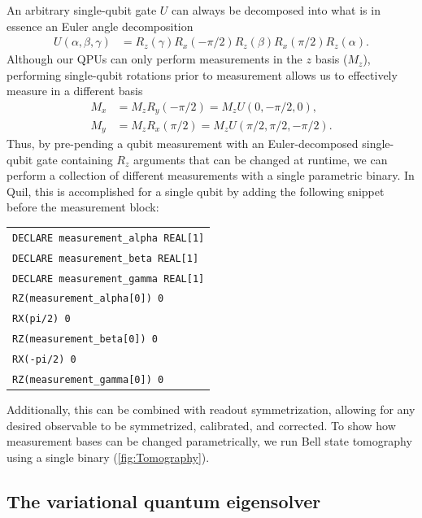 \documentclass[12pt]{iopart}
\begin{document}
An arbitrary single-qubit gate $U$ can always be decomposed into what is in essence an Euler angle decomposition~\cite{MikeAndIke}
\begin{align}
    U(\alpha, \beta, \gamma) &= R_z(\gamma) R_x(-\pi/2) R_z(\beta) R_x(\pi/2) R_z(\alpha).
\end{align}
Although our QPUs can only perform measurements in the $z$ basis ($M_z$), performing single-qubit rotations prior to measurement allows us to effectively measure in a different basis
\begin{align}
    M_x &= M_z R_y(-\pi/2) = M_z U(0, -\pi/2, 0),\\
    M_y &= M_z R_x(\pi/2) = M_z U(\pi/2, \pi/2, -\pi/2).
\end{align}
Thus, by pre-pending a qubit measurement with an Euler-decomposed single-qubit gate containing $R_z$ arguments that can be changed at runtime, we can perform a collection of different measurements with a single parametric binary. In Quil, this is accomplished for a single qubit by adding the following snippet before the measurement block:
\begin{center}
\begin{tabular}{l}
\verb|DECLARE measurement_alpha REAL[1]|\\
\verb|DECLARE measurement_beta REAL[1]|\\
\verb|DECLARE measurement_gamma REAL[1]|\\
\verb|RZ(measurement_alpha[0]) 0|\\
\verb|RX(pi/2) 0|\\
\verb|RZ(measurement_beta[0]) 0|\\
\verb|RX(-pi/2) 0|\\
\verb|RZ(measurement_gamma[0]) 0|\\
\end{tabular}
\end{center}
Additionally, this can be combined with readout symmetrization, allowing for any desired observable to be symmetrized, calibrated, and corrected. To show how measurement bases can be changed parametrically, we run Bell state tomography using a single binary (\cref{fig:Tomography}).

\subsection{The variational quantum eigensolver}
\end{document}
